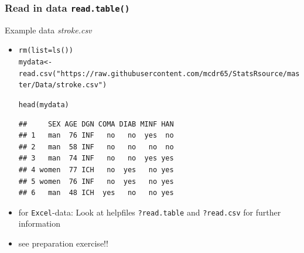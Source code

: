 \documentclass[extsize,handout,10pt]{beamer}\usepackage[]{graphicx}\usepackage[]{color}
\makeatletter
\newcommand{\hlstr}[1]{\textcolor[rgb]{1,0.4,0.2}{#1}}%
\newcommand{\hlstd}[1]{\textcolor[rgb]{0.251,0.251,0.251}{#1}}%
\newcommand{\hlkwb}[1]{\textcolor[rgb]{0,0.439,0.902}{#1}}%
\newcommand{\hlkwc}[1]{\textcolor[rgb]{0.188,0.941,0.314}{#1}}%
\newcommand{\hlkwd}[1]{\textcolor[rgb]{0.69,0.188,0.941}{#1}}%
\newenvironment{kframe}{%
 \def\at@end@of@kframe{}%
 \ifinner\ifhmode%
  \def\at@end@of@kframe{\end{minipage}}%
  \begin{minipage}{\columnwidth}%
 \fi\fi%
 \def\FrameCommand##1{\hskip\@totalleftmargin \hskip-\fboxsep
 \colorbox{shadecolor}{##1}\hskip-\fboxsep
     \hskip-\linewidth \hskip-\@totalleftmargin \hskip\columnwidth}%
 \MakeFramed {\advance\hsize-\width
   \@totalleftmargin\z@ \linewidth\hsize
   \@setminipage}}%
 {\par\unskip\endMakeFramed%
 \at@end@of@kframe}
\newenvironment{knitrout}{}{} %
\makeatother
\begin{document}
    
    



\begin{frame}[containsverbatim]
  \frametitle{Read in data \texttt{read.table()}}
  Example data \emph{stroke.csv}
  \begin{itemize}
    \scriptsize
  \item 
\begin{knitrout}\tiny
{}\color{fgcolor}\begin{kframe}
\begin{alltt}
\hlkwd{rm}\hlstd{(}\hlkwc{list}\hlstd{=}\hlkwd{ls}\hlstd{())}
\hlstd{mydata}  \hlkwb{<-}  \hlkwd{read.csv}\hlstd{(}\hlstr{"https://raw.githubusercontent.com/mcdr65/StatsRsource/master/Data/stroke.csv"}\hlstd{)}
\end{alltt}
\end{kframe}
\end{knitrout}

\begin{knitrout}\tiny
{}\color{fgcolor}\begin{kframe}
\begin{alltt}
\hlkwd{head}\hlstd{(mydata)}
\end{alltt}
\begin{verbatim}
##     SEX AGE DGN COMA DIAB MINF HAN
## 1   man  76 INF   no   no  yes  no
## 2   man  58 INF   no   no   no  no
## 3   man  74 INF   no   no  yes yes
## 4 women  77 ICH   no  yes   no yes
## 5 women  76 INF   no  yes   no yes
## 6   man  48 ICH  yes   no   no yes
\end{verbatim}
\end{kframe}
\end{knitrout}

  \normalsize
  \item for \texttt{Excel}-data: Look at helpfiles
    \alert{\texttt{?read.table}} and \alert{\texttt{?read.csv}} for further
    information
  \item \alert{see preparation exercise!!} 
  \end{itemize}
\end{frame}
\end{document}

